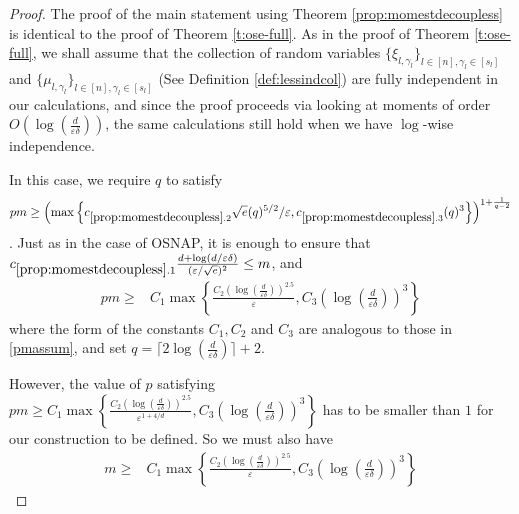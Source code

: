\documentclass[11pt]{amsart}
\numberwithin{equation}{section}
\numberwithin{equation}{section}
\DeclarePairedDelimiter{\paren}{(}{)}
\theoremstyle{remark}
\theoremstyle{definition}
\begin{document}
\begin{proof}
    The proof of the main statement using Theorem \ref{prop:momestdecoupless} is identical to the proof of Theorem \ref{t:ose-full}. As in the proof of Theorem \ref{t:ose-full}, we shall assume that the collection of random variables $\{ \xi_{l,\gamma_l} \}_{l \in [n], \gamma_l \in [s_l]}$ and $\{ \mu_{l,\gamma_l} \}_{l \in [n], \gamma_l \in [s_l]}$ (See Definition \ref{def:lessindcol}) are fully independent in our calculations, and since the proof proceeds via looking at moments of order $O( \log (\frac{d}{\varepsilon \delta}))$, the same calculations still hold when we have $\log$-wise independence. 

    In this case, we require $q$ to satisfy $$ pm \ge \paren*{\max \left\{ c_{\ref*{prop:momestdecoupless}.2} \sqrt{e} (q)^{5/2}/\varepsilon, c_{\ref*{prop:momestdecoupless}.3} (q)^3 \right\}}^{1+\frac{1}{q-2}} $$. Just as in the case of OSNAP, it is enough to ensure that $c_{\ref*{prop:momestdecoupless}.1} \frac{d+\log(d/\varepsilon\delta)}{(\varepsilon/\sqrt{e})^2} \le m $, and
    \begin{align*}pm \ge & C_1 \max \left\{ \frac{C_2(\log(\frac{d}{\varepsilon \delta}))^{2.5}}{ \varepsilon}, C_3(\log(\frac{d}{\varepsilon \delta}))^3 \right\}
    \end{align*}
    where the form of the constants $C_1, C_2$ and $C_3$ are analogous to those in \eqref{pmassum}, and set $q= \lceil 2\log (\frac{d}{\varepsilon \delta} )\rceil+2$. 

    However, the value of $p$ satisfying $pm \ge  C_1 \max \left\{ \frac{C_2(\log(\frac{d}{\varepsilon \delta}))^{2.5}}{ \varepsilon^{1+4/d}}, C_3(\log(\frac{d}{\varepsilon \delta}))^3 \right\}$ has to be smaller than $1$ for our construction to be defined. So we must also have \begin{align*}m \ge & C_1 \max \left\{ \frac{C_2(\log(\frac{d}{\varepsilon \delta}))^{2.5}}{ \varepsilon}, C_3(\log(\frac{d}{\varepsilon \delta}))^3 \right\}\end{align*}



\end{proof}
\end{document}
